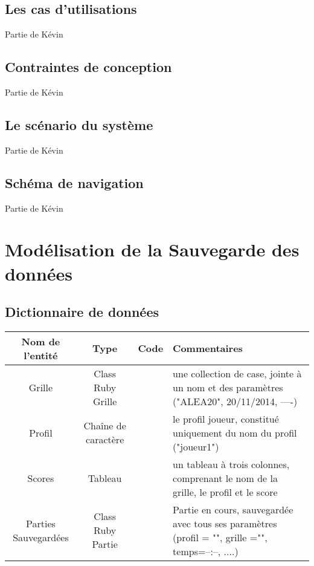 \documentclass[11pt]{article}
\begin{document}
\subsection{Les cas d'utilisations}

Partie de Kévin
\subsection{Contraintes de conception}

Partie de Kévin
\subsection{Le scénario du système}

Partie de Kévin
\subsection{Schéma de navigation}

Partie de Kévin


\newpage

\section{Modélisation de la Sauvegarde des données}

\subsection{Dictionnaire de données}


\begin{tabular}{|c|c|c|l|}\hline
    {\bf Nom de l'entité} & {\bf Type } & {\bf Code} & {\bf Commentaires}\\\hline
    Grille & Class Ruby Grille & & une collection de case, jointe à un nom et des paramètres ("ALEA20", 20/11/2014, ----)\\\hline
    Profil & Chaîne de caractère & & le profil joueur, constitué uniquement du nom du profil ("joueur1")\\\hline
    Scores & Tableau & & un tableau à trois colonnes, comprenant le nom de la grille, le profil et le score\\\hline
    Parties Sauvegardées & Class Ruby Partie & & Partie en cours, sauvegardée avec tous ses paramètres (profil = "", grille ="", temps=--:--, ....) \\\hline 
\end{tabular}
\end{document}
